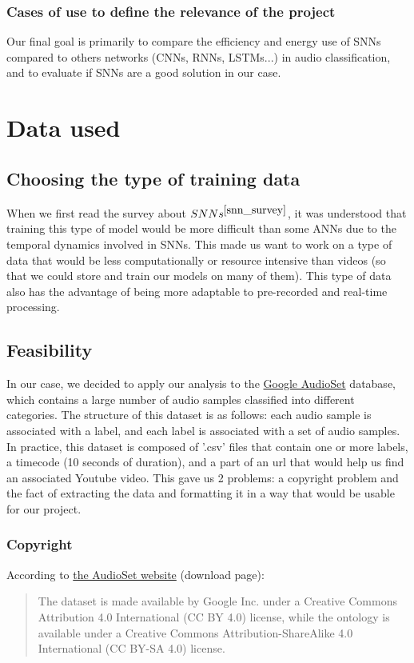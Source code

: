 \documentclass[11pt]{article}
\begin{document}
\subsubsection{Cases of use to define the relevance of the project}
Our final goal is primarily to compare the efficiency and energy use of SNNs compared to others networks (CNNs, RNNs, LSTMs...) in audio classification, and to evaluate if SNNs are a good solution in our case.


\section{Data used}
\subsection{Choosing the type of training data}

When we first read the survey about $SNNs^{\cite{snn_survey}}$, it was understood that training this type of model would be more difficult than some ANNs due to the temporal dynamics involved in SNNs. This made us want to work on a type of data that would be less computationally or resource intensive than videos (so that we could store and train our models on many of them). This type of data also has the advantage of being more adaptable to pre-recorded and real-time processing.
\subsection{Feasibility}

In our case, we decided to apply our analysis to the \hyperref[item:google-audioset]{Google AudioSet} database, which contains a large number of audio samples classified into different categories.
The structure of this dataset is as follows: each audio sample is associated with a label, and each label is associated with a set of audio samples. In practice, this dataset is composed of '.csv' files that contain one or more labels, a timecode (10 seconds of duration), and a part of an url that would help us find an associated Youtube video. This gave us 2 problems: a copyright problem and the fact of extracting the data and formatting it in a way that would be usable for our project.

\subsubsection{Copyright}

According to \hyperref[item:google-audioset]{the AudioSet website} (download page): \begin{quote}

  The dataset is made available by Google Inc. under a Creative Commons Attribution 4.0 International (CC BY 4.0) license, while the ontology is available under a Creative Commons Attribution-ShareAlike 4.0 International (CC BY-SA 4.0) license.\end{quote}
\end{document}

